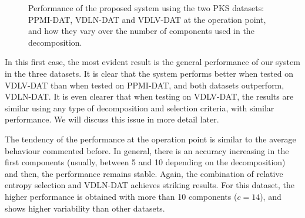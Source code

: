 \begin{figure}
	
	\caption[Performance at the operation point for the \acs{PKS} datasets, over the number of components.]{Performance of the proposed system using the two \ac{PKS} datasets: PPMI-DAT, VDLN-DAT and VDLV-DAT at the operation point, and how they vary over the number of components used in the decomposition. } 
	\label{fig:accuracyOP-PKS}
\end{figure}

In this first case, the most evident result is the general performance of our system in the three datasets. It is clear that the system performs better when tested on VDLV-DAT than when tested on PPMI-DAT, and both datasets outperform, VDLN-DAT. It is even clearer that when testing on VDLV-DAT, the results are similar using any type of decomposition and selection criteria, with similar performance. We will discuss this issue in more detail later. 

The tendency of the performance at the operation point is similar to the average behaviour commented before. In general, there is an accuracy increasing in the first components (usually, between 5 and 10 depending on the decomposition) and then, the performance remains stable. Again, the combination of relative entropy selection and VDLN-DAT achieves striking results. For this dataset, the higher performance is obtained with more than 10 components ($c=14$), and shows higher variability than other datasets. 

